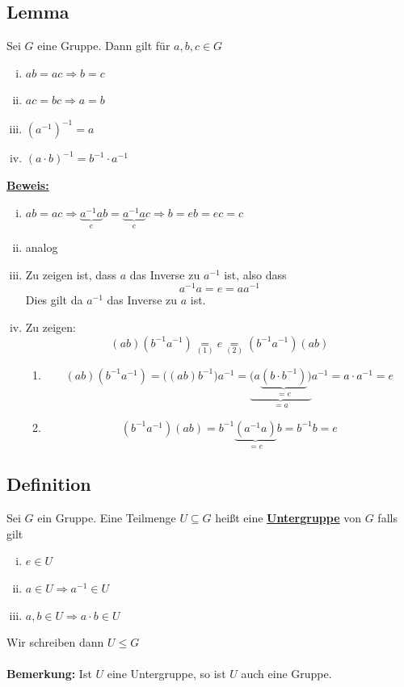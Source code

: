 \subsection{Lemma}
Sei \(G\) eine Gruppe. Dann gilt für \(a,b,c \in G\)
\begin{enumerate}[i)]
\item \(ab=ac \Longrightarrow b=c\)
\item \( ac = bc \Longrightarrow a=b\)
\item \( (a^{-1})^{-1}= a \)
\item \( (a \cdot b)^{-1} = b^{-1} \cdot a^{-1} \)
\end{enumerate}
\underline{\textbf{Beweis:}}
\begin{enumerate}[i)]
\item \( ab=ac \Longrightarrow \underbrace{a^{-1}a}_{e} b = \underbrace{a^{-1}a}_{e} c \Longrightarrow b=eb=ec=c \)
\item analog
\item Zu zeigen ist, dass \(a\) das Inverse zu \(a^{-1}\) ist, also dass
\[
a^{-1}a=e=aa^{-1}
\]
Dies gilt da \(a^{-1}\) das Inverse zu \(a\) ist.
\item Zu zeigen: 
\[
(ab)(b^{-1}a^{-1})\underset{(1)}{=}e\underset{(2)}{=}(b^{-1}a^{-1})(ab)
\]
\begin{enumerate}[(1)]
\item 
\[
(ab)(b^{-1}a^{-1}) = \big((ab)b^{-1}\big)a^{-1} = \underbrace{\big(a\underbrace{(b \cdot b^{-1})}_{=e}\big)}_{=a} a^{-1} 
= a \cdot a^{-1} = e
\]
\item
\[
(b^{-1}a^{-1})(ab)= b^{-1} \underbrace{(a^{-1}a)}_{=e}b=b^{-1}b=e
\]
\end{enumerate}
\end{enumerate}

\subsection{Definition}
Sei \(G\) ein Gruppe. Eine Teilmenge \( U \subseteq G\) heißt eine \underline{\textbf{Untergruppe}} von \(G\) falls gilt
\begin{enumerate}[i)]
\item \( e \in U \)
\item \( a \in U \Rightarrow a^{-1} \in U \)
\item \( a,b \in U \Rightarrow a \cdot b \in U\)
\end{enumerate}
Wir schreiben dann \(U \leq G\) \\
\vspace{\baselineskip} \\ \vspace{\baselineskip}\textbf{Bemerkung:} Ist \(U\) eine Untergruppe, so ist \(U\) auch eine Gruppe. \\

